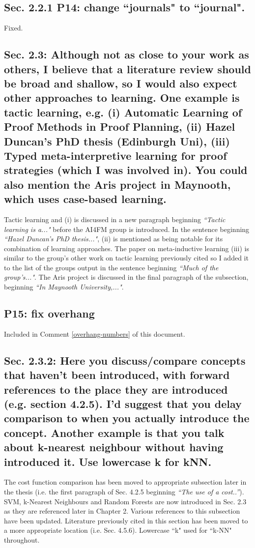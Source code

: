 \documentclass[]{article}
\begin{document}
\subsection{Sec. 2.2.1 P14: change ``journals" to ``journal".}

Fixed.

\subsection{Sec. 2.3: Although not as close to your work as others, I believe that a literature review should be broad and shallow, so I would also expect other approaches to learning. One example is tactic learning, e.g. (i) Automatic Learning of Proof Methods in Proof Planning, (ii) Hazel Duncan's PhD thesis (Edinburgh Uni), (iii) Typed meta-interpretive learning for proof strategies (which I was involved in). You could also mention the Aris project in Maynooth, which uses case-based learning.}

Tactic learning and (i) is discussed in a new paragraph beginning \emph{``Tactic learning is a..."} before the AI4FM group is introduced.
In the sentence beginning \emph{``Hazel Duncan's PhD thesis..."}, (ii) is mentioned as being notable for its combination of learning approaches.
The paper on meta-inductive learning (iii) is similar to the group's other work on tactic learning previously cited so I added it to the list of the groups output in the sentence beginning \emph{``Much of the group's..."}. The Aris project is discussed in the final paragraph of the subsection, beginning \emph{``In Maynooth University,..."}.


\subsection{P15: fix overhang}

Included in Comment \ref{overhang-numbers} of this document.

\subsection{Sec. 2.3.2: Here you discuss/compare concepts that haven't been introduced, with forward references to the place they are introduced (e.g. section 4.2.5). I'd suggest that you delay comparison to when you actually introduce the concept. Another example is that you talk about k-nearest neighbour without having introduced it. Use lowercase k for kNN.}

The cost function comparison has been moved to appropriate subsection later in the thesis (i.e. the first paragraph of Sec. 4.2.5 beginning \emph{``The use of a cost..''}).
SVM, k-Nearest Neighbours and Random Forests are now introduced in Sec. 2.3 as they are referenced later in Chapter 2. 
Various references to this subsection have been updated.
Literature previously cited in this section has been moved to a more appropriate location (i.e. Sec. 4.5.6). 
Lowercase ``k" used for ``k-NN" throughout.
\end{document}
